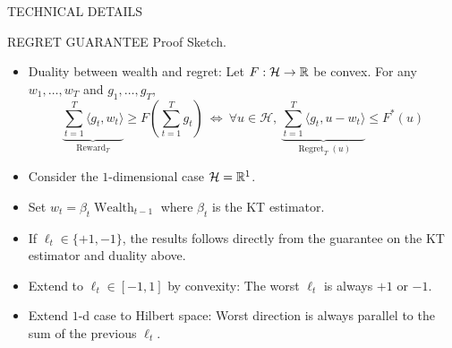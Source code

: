 \documentclass[final,t,serif,mathserif]{beamer}
\DeclareMathOperator{\Wealth}{Wealth}
\renewcommand{\H}{\mathcal{H}}  %
\DeclareMathOperator{\Regret}{Regret}
\DeclareMathOperator{\Reward}{Reward}
\def\spaziooo{\vspace{-0.cm}}
\begin{document}
\begin{frame}{}
\begin{columns}[t]
\begin{column}{.33\linewidth}
\begin{block}{TECHNICAL DETAILS}
\begin{minipage}{.98\linewidth}
\begin{block}{REGRET GUARANTEE}
    \alert{Proof Sketch.}
    \begin{itemize}
    \item Duality between wealth and regret: Let $F:\H \to \R$ be convex. For any $w_1, \dots, w_T$ and $g_1, \dots, g_T$,
    \[
      \underbrace{\sum_{t=1}^T \langle g_t, w_t \rangle}_{\Reward_T} \ge F\left( \sum_{t=1}^T g_t \right)
      \ \Leftrightarrow \
      \forall u \in \H, \
      \underbrace{\sum_{t=1}^T \langle g_t, u - w_t\rangle}_{\Regret_T(u)} \le F^*(u)
    \]
    \item Consider the $1$-dimensional case $\H=\R^1$.
    \item Set $w_t=\beta_t \Wealth_{t-1}$ where $\beta_t$ is the KT estimator.
    \item If $\ell_t \in \{+1, -1\}$, the results follows directly from the guarantee on the KT estimator and duality above.
    \item Extend to $\ell_t \in [-1,1]$ by convexity: The worst $\ell_t$ is always $+1$ or $-1$.
    \item Extend $1$-d case to Hilbert space: Worst direction is always parallel to the sum of the previous $\ell_t$.
    \end{itemize}
    \spaziooo
    \end{block}
    \end{minipage}
    \end{block}

  \end{column}
\end{columns}
\end{frame}
\end{document}

